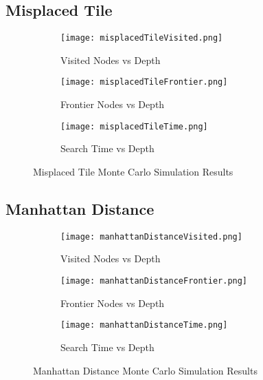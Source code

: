 \documentclass{article}
\begin{document}
\subsection{Misplaced Tile}
\begin{figure}[h]
	\centering
	\begin{subfigure}[b]{0.32\textwidth}
		\centering
		\texttt{[image: misplacedTileVisited.png]}
		\caption{Visited Nodes vs Depth}
		\label{fig:Misplaced Tile Visited Nodes}
	\end{subfigure}
	\hfill
	\begin{subfigure}[b]{0.32\textwidth}
		\centering
		\texttt{[image: misplacedTileFrontier.png]}
		\caption{Frontier Nodes vs Depth}
		\label{fig:Misplaced Tile Frontier Nodes}
	\end{subfigure}
	\hfill
	\begin{subfigure}[b]{0.32\textwidth}
		\centering
		\texttt{[image: misplacedTileTime.png]}
		\caption{Search Time vs Depth}
		\label{fig:Misplaced Tile Frontier Nodes}
	\end{subfigure}
	\caption{Misplaced Tile Monte Carlo Simulation Results}
	\label{fig:Misplaced Tile Monte Carlo Simulation}
\end{figure}
\subsection{Manhattan Distance}
\begin{figure}[h]
	\centering
	\begin{subfigure}[b]{0.32\textwidth}
		\centering
		\texttt{[image: manhattanDistanceVisited.png]}
		\caption{Visited Nodes vs Depth}
		\label{fig:Manhattan Distance Visited Nodes}
	\end{subfigure}
	\hfill
	\begin{subfigure}[b]{0.32\textwidth}
		\centering
		\texttt{[image: manhattanDistanceFrontier.png]}
		\caption{Frontier Nodes vs Depth}
		\label{fig:Manhattan Distance Frontier Nodes}
	\end{subfigure}
	\hfill
	\begin{subfigure}[b]{0.32\textwidth}
		\centering
		\texttt{[image: manhattanDistanceTime.png]}
		\caption{Search Time vs Depth}
		\label{fig:Manhattan Distance Frontier Nodes}
	\end{subfigure}
	\caption{Manhattan Distance Monte Carlo Simulation Results}
	\label{fig:Manhattan Distance Monte Carlo Simulation}
\end{figure}
\end{document}
